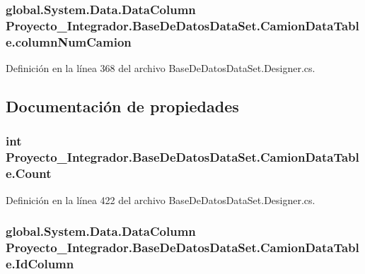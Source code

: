 \subsubsection[{column\-Num\-Camion}]{\setlength{\rightskip}{0pt plus 5cm}global.\-System.\-Data.\-Data\-Column Proyecto\-\_\-\-Integrador.\-Base\-De\-Datos\-Data\-Set.\-Camion\-Data\-Table.\-column\-Num\-Camion\hspace{0.3cm}{\ttfamily [private]}}\label{class_proyecto___integrador_1_1_base_de_datos_data_set_1_1_camion_data_table_a933613e63f748810ba0cd170a3ef1291}


Definición en la línea 368 del archivo Base\-De\-Datos\-Data\-Set.\-Designer.\-cs.



\subsection{Documentación de propiedades}
\subsubsection[{Count}]{\setlength{\rightskip}{0pt plus 5cm}int Proyecto\-\_\-\-Integrador.\-Base\-De\-Datos\-Data\-Set.\-Camion\-Data\-Table.\-Count\hspace{0.3cm}{\ttfamily [get]}}\label{class_proyecto___integrador_1_1_base_de_datos_data_set_1_1_camion_data_table_a53791db6648059164afbd83e8c19c97c}


Definición en la línea 422 del archivo Base\-De\-Datos\-Data\-Set.\-Designer.\-cs.

\subsubsection[{Id\-Column}]{\setlength{\rightskip}{0pt plus 5cm}global.\-System.\-Data.\-Data\-Column Proyecto\-\_\-\-Integrador.\-Base\-De\-Datos\-Data\-Set.\-Camion\-Data\-Table.\-Id\-Column\hspace{0.3cm}{\ttfamily [get]}}\label{class_proyecto___integrador_1_1_base_de_datos_data_set_1_1_camion_data_table_a2030608fe7b6c6296107c491010c136c}


